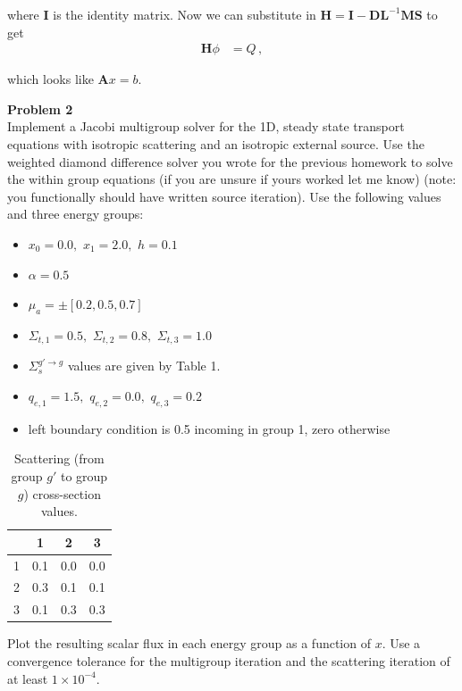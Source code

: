 \documentclass[10pt]{article}
\begin{document}
where \textbf{I} is the identity matrix. Now we can substitute in  $\textbf{H} = \textbf{I} - \textbf{D}\textbf{L} ^{-1}\textbf{MS}$ to get 
%
\begin{align*}
    \textbf{H}\phi &= Q \,,
\end{align*} 

which looks like $\textbf{A}x = b$.





\newpage
\noindent \textbf{Problem 2}\\
Implement a Jacobi multigroup solver for the 1D, steady state transport equations with isotropic scattering and an isotropic external source. Use the weighted diamond difference solver you wrote for the previous homework to solve the within group equations (if you are unsure if yours worked let me know) (note: you functionally should have written source iteration). Use the following values and three energy groups:
%
\begin{itemize}
\setlength\itemsep{-3pt}
    \item $x_0=0.0,\,\,x_1=2.0,\,\,h=0.1$
    \item $\alpha=0.5$
    \item $\mu_a = \pm[0.2,0.5,0.7]$
    \item $\Sigma_{t,1}=0.5,\,\, \Sigma_{t,2}=0.8,\,\, \Sigma_{t,3}=1.0$
    \item $\Sigma_s^{g' \rightarrow g}$ values are given by Table 1.
    \item $q_{e,1}=1.5,\,\, q_{e,2}=0.0,\,\, q_{e,3}=0.2$
    \item left boundary condition is 0.5 incoming in group 1, zero otherwise
\end{itemize}
%
\begin{table}[htb!]
	\centering
	\setlength{\tabcolsep}{10pt}
	\begin{tabular}{|c|c|c|c|}
		\hline
		\diagbox[width=40pt, height=20pt]{$g$}{$g'$} & 1 & 2 & 3 \\ \hline
		1 & 0.1 & 0.0 & 0.0 \\ 
		2 & 0.3 & 0.1 & 0.1 \\ 
		3 & 0.1 & 0.3 & 0.3 \\ \hline
	\end{tabular}
	\caption{Scattering (from group $g'$ to group $g$) cross-section values.}
\end{table}


Plot the resulting scalar flux in each energy group as a function of $x$. Use a convergence tolerance for the multigroup iteration and the scattering iteration of at least $1 \times 10^{-4}$.\\
\end{document}
